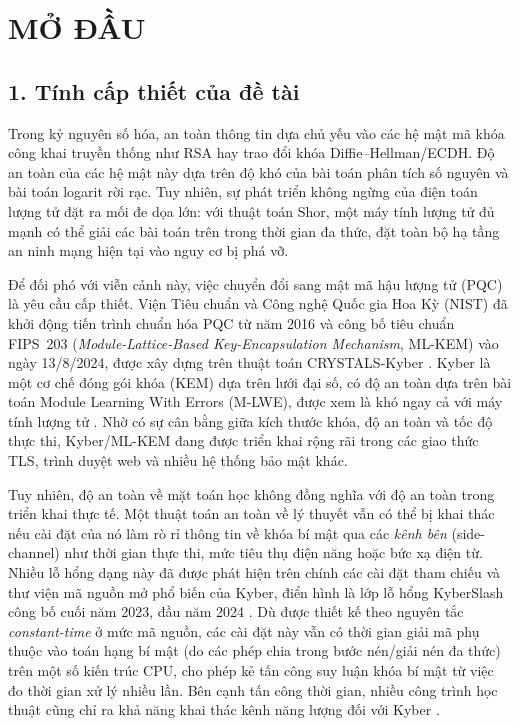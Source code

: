 \documentclass[../LuanVan.tex]{subfiles}
\begin{document}
\chapter*{MỞ ĐẦU}

\section*{1. Tính cấp thiết của đề tài}

Trong kỷ nguyên số hóa, an toàn thông tin dựa chủ yếu vào các hệ mật mã khóa công khai truyền thống như RSA hay trao đổi khóa Diffie--Hellman/ECDH. Độ an toàn của các hệ mật này dựa trên độ khó của bài toán phân tích số nguyên và bài toán logarit rời rạc. Tuy nhiên, sự phát triển không ngừng của điện toán lượng tử đặt ra mối đe dọa lớn: với thuật toán Shor, một máy tính lượng tử đủ mạnh có thể giải các bài toán trên trong thời gian đa thức, đặt toàn bộ hạ tầng an ninh mạng hiện tại vào nguy cơ bị phá vỡ.

Để đối phó với viễn cảnh này, việc chuyển đổi sang mật mã hậu lượng tử (PQC) là yêu cầu cấp thiết. Viện Tiêu chuẩn và Công nghệ Quốc gia Hoa Kỳ (NIST) đã khởi động tiến trình chuẩn hóa PQC từ năm 2016 và công bố tiêu chuẩn FIPS~203 (\textit{Module-Lattice-Based Key-Encapsulation Mechanism}, ML-KEM) vào ngày 13/8/2024, được xây dựng trên thuật toán CRYSTALS-Kyber \cite{nist2024fips203}. Kyber là một cơ chế đóng gói khóa (KEM) dựa trên lưới đại số, có độ an toàn dựa trên bài toán Module Learning With Errors (M-LWE), được xem là khó ngay cả với máy tính lượng tử \cite{bos2018kyber,chi2015lattice}. Nhờ có sự cân bằng giữa kích thước khóa, độ an toàn và tốc độ thực thi, Kyber/ML-KEM đang được triển khai rộng rãi trong các giao thức TLS, trình duyệt web và nhiều hệ thống bảo mật khác.

Tuy nhiên, độ an toàn về mặt toán học không đồng nghĩa với độ an toàn trong triển khai thực tế. Một thuật toán an toàn về lý thuyết vẫn có thể bị khai thác nếu cài đặt của nó làm rò rỉ thông tin về khóa bí mật qua các \textit{kênh bên} (side-channel) như thời gian thực thi, mức tiêu thụ điện năng hoặc bức xạ điện từ. Nhiều lỗ hổng dạng này đã được phát hiện trên chính các cài đặt tham chiếu và thư viện mã nguồn mở phổ biến của Kyber, điển hình là lớp lỗ hổng KyberSlash công bố cuối năm 2023, đầu năm 2024 \cite{bernstein2025kyberslash}. Dù được thiết kế theo nguyên tắc \textit{constant-time} ở mức mã nguồn, các cài đặt này vẫn có thời gian giải mã phụ thuộc vào toán hạng bí mật (do các phép chia trong bước nén/giải nén đa thức) trên một số kiến trúc CPU, cho phép kẻ tấn công suy luận khóa bí mật từ việc đo thời gian xử lý nhiều lần. Bên cạnh tấn công thời gian, nhiều công trình học thuật cũng chỉ ra khả năng khai thác kênh năng lượng đối với Kyber \cite{wang2023bitsliced,ji2023masked}.
\end{document}
